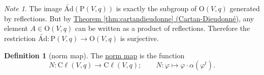 \documentclass[a4paper]{report}
\newcommand{\defn}[1]{\ul{#1}}
\newcommand{\cliff}{\mathrm{C}\ell}
\newcommand{\tAd}{\widetilde{\mathrm{Ad}}}
\newcommand{\Or}{\mathrm{O}}
\theoremstyle{definition}
\newtheorem{definition}{Definition}[section]
\theoremstyle{plain}
\theoremstyle{remark}
\newtheorem{note}{Note}[section]
\begin{document}
\begin{note}
  \label{note:restrictionoftAdtopissurjective}
  The image $\tAd(\mathrm{P}(V, q))$ is exactly the subgroup of $\Or(V, q)$ generated by reflections. But by \hyperref[thm:cartandieudonne]{Theorem \ref*{thm:cartandieudonne} (Cartan-Dieudonn{\'e})}, any element $A \in \Or(V, q)$ can be written as a product of reflections. Therefore the restriction $\tAd\colon \mathrm{P}(V, q) \to \Or(V, q)$ is surjective.
\end{note} 

\begin{definition}[norm map]
  \label{def:normmap}
  The \defn{norm map} is the function 
  \begin{equation*}
    N\colon \cliff(V, q) \to \cliff(V, q);\qquad N\colon \varphi \mapsto \varphi \cdot \alpha(\varphi^{t}).
  \end{equation*}
\end{definition}
\end{document}
